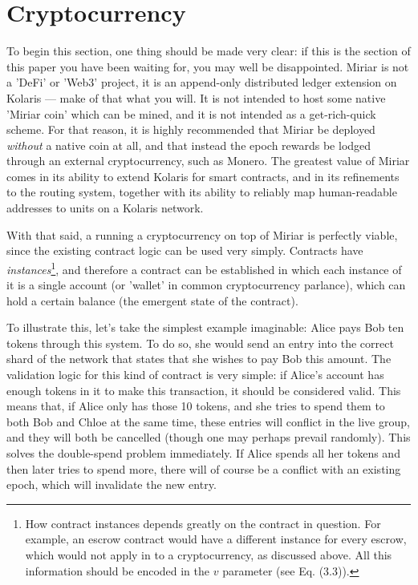 \documentclass{extreport}
\begin{document}
\chapter{Cryptocurrency}
\label{sec:org7b7ddbf}

To begin this section, one thing should be made very clear: if this is the section of this paper you have been waiting for, you may well be disappointed. Miriar is not a 'DeFi' or 'Web3' project, it is an append-only distributed ledger extension on Kolaris --- make of that what you will. It is not intended to host some native 'Miriar coin' which can be mined, and it is not intended as a get-rich-quick scheme. For that reason, it is highly recommended that Miriar be deployed \emph{without} a native coin at all, and that instead the epoch rewards be lodged through an external cryptocurrency, such as Monero. The greatest value of Miriar comes in its ability to extend Kolaris for smart contracts, and in its refinements to the routing system, together with its ability to reliably map human-readable addresses to units on a Kolaris network.

With that said, a running a cryptocurrency on top of Miriar is perfectly viable, since the existing contract logic can be used very simply. Contracts have \emph{instances}\footnote{How contract instances depends greatly on the contract in question. For example, an escrow contract would have a different instance for every escrow, which would not apply in to a cryptocurrency, as discussed above. All this information should be encoded in the \(v\) parameter (see Eq. (3.3)).}, and therefore a contract can be established in which each instance of it is a single account (or 'wallet' in common cryptocurrency parlance), which can hold a certain balance (the emergent state of the contract).

To illustrate this, let's take the simplest example imaginable: Alice pays Bob ten tokens through this system. To do so, she would send an entry into the correct shard of the network that states that she wishes to pay Bob this amount. The validation logic for this kind of contract is very simple: if Alice's account has enough tokens in it to make this transaction, it should be considered valid. This means that, if Alice only has those 10 tokens, and she tries to spend them to both Bob and Chloe at the same time, these entries will conflict in the live group, and they will both be cancelled (though one may perhaps prevail randomly). This solves the double-spend problem immediately. If Alice spends all her tokens and then later tries to spend more, there will of course be a conflict with an existing epoch, which will invalidate the new entry.
\end{document}
